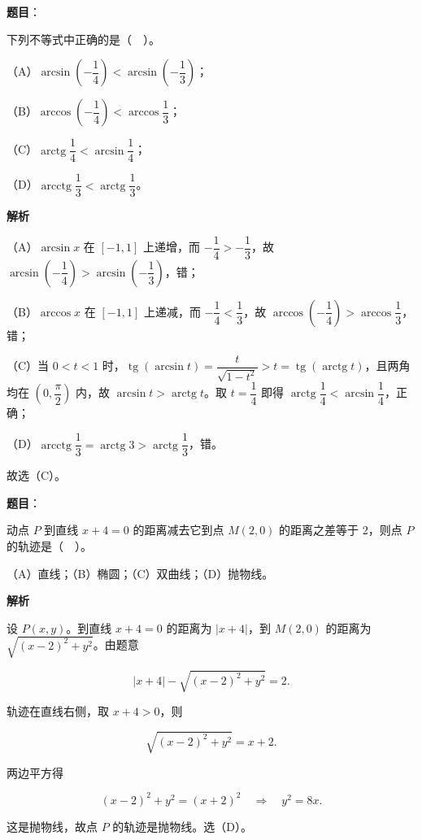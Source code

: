 \begin{answer}

\textbf{题目}：

下列不等式中正确的是（　）。

（A）$\arcsin\left(-\dfrac14\right)<\arcsin\left(-\dfrac13\right)$；

（B）$\arccos\left(-\dfrac14\right)<\arccos\dfrac13$；

（C）$\operatorname{arctg}\dfrac14<\arcsin\dfrac14$；

（D）$\operatorname{arcctg}\dfrac13<\operatorname{arctg}\dfrac13$。

\textbf{解析}

（A）$\arcsin x$ 在 $[-1,1]$ 上递增，而 $-\dfrac14>-\dfrac13$，故 $\arcsin\left(-\dfrac14\right)>\arcsin\left(-\dfrac13\right)$，错；

（B）$\arccos x$ 在 $[-1,1]$ 上递减，而 $-\dfrac14<\dfrac13$，故 $\arccos\left(-\dfrac14\right)>\arccos\dfrac13$，错；

（C）当 $0<t<1$ 时，$\operatorname{tg}(\arcsin t)=\dfrac{t}{\sqrt{1-t^2}}>t=\operatorname{tg}(\operatorname{arctg}t)$，且两角均在 $\left(0,\dfrac{\pi}{2}\right)$ 内，故 $\arcsin t>\operatorname{arctg}t$。取 $t=\dfrac14$ 即得 $\operatorname{arctg}\dfrac14<\arcsin\dfrac14$，正确；

（D）$\operatorname{arcctg}\dfrac13=\operatorname{arctg}3>\operatorname{arctg}\dfrac13$，错。

故选（C）。


\end{answer}
\begin{answer}

\textbf{题目}：

动点 $P$ 到直线 $x+4=0$ 的距离减去它到点 $M(2,0)$ 的距离之差等于 2，则点 $P$ 的轨迹是（　）。

（A）直线；（B）椭圆；（C）双曲线；（D）抛物线。

\textbf{解析}

设 $P(x,y)$。到直线 $x+4=0$ 的距离为 $|x+4|$，到 $M(2,0)$ 的距离为 $\sqrt{(x-2)^2+y^2}$。由题意

\nopagebreak[4]
\[
|x+4|-\sqrt{(x-2)^2+y^2}=2.
\]

轨迹在直线右侧，取 $x+4>0$，则

\nopagebreak[4]
\[
\sqrt{(x-2)^2+y^2}=x+2.
\]

两边平方得

\nopagebreak[4]
\[
(x-2)^2+y^2=(x+2)^2 \quad\Longrightarrow\quad y^2=8x.
\]

这是抛物线，故点 $P$ 的轨迹是抛物线。选（D）。


\end{answer}
